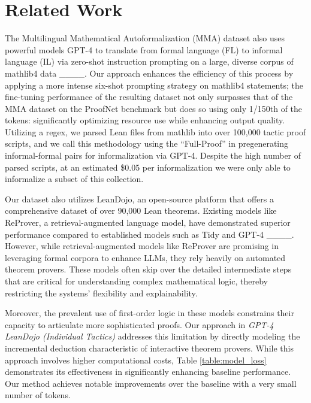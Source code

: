 \section{Related Work}
The Multilingual Mathematical Autoformalization (MMA) dataset also uses powerful models GPT-4 to translate from formal language (FL) to informal language (IL) via zero-shot instruction prompting on a large, diverse corpus of mathlib4 data ____. Our approach enhances the efficiency of this process by applying a more intense six-shot prompting strategy on mathlib4 statements; the fine-tuning performance of the resulting dataset not only surpasses that of the MMA dataset on the ProofNet benchmark but does so using only 1/150th of the tokens: significantly optimizing resource use while enhancing output quality. Utilizing a regex, we parsed Lean files from mathlib into over 100,000 tactic proof scripts, and we call this methodology using the “Full-Proof” in pregenerating informal-formal pairs for informalization via GPT-4. Despite the high number of parsed scripts, at an estimated \$0.05 per informalization we were only able to informalize a subset of this collection.

Our dataset also utilizes LeanDojo, an open-source platform that offers a comprehensive dataset of over 90,000 Lean theorems. Existing models like ReProver, a retrieval-augmented language model, have demonstrated superior performance compared to established models such as Tidy and GPT-4 ____. However, while retrieval-augmented models like ReProver are promising in leveraging formal corpora to enhance LLMs, they rely heavily on automated theorem provers. These models often skip over the detailed intermediate steps that are critical for understanding complex mathematical logic, thereby restricting the systems' flexibility and explainability.

Moreover, the prevalent use of first-order logic in these models constrains their capacity to articulate more sophisticated proofs. Our approach in \textit{GPT-4 LeanDojo (Individual Tactics)} addresses this limitation by directly modeling the incremental deduction characteristic of interactive theorem provers. While this approach involves higher computational costs, Table \ref{table:model_loss} demonstrates its effectiveness in significantly enhancing baseline performance. Our method achieves notable improvements over the baseline with a very small number of tokens.